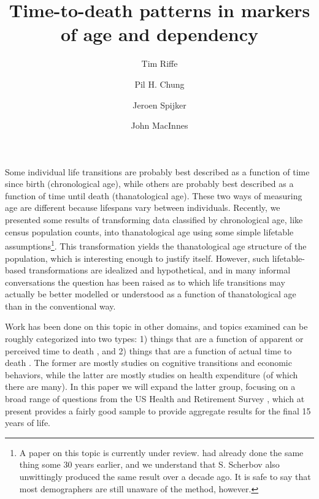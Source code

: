 \documentclass{article}
\begin{document}
\title{Time-to-death patterns in markers of age and dependency}

\author[1]{Tim Riffe}
\author[1]{Pil H. Chung}
\author[2,3]{Jeroen Spijker}
\author[4]{John MacInnes}

\maketitle

Some individual life transitions are probably best described as a function of
time since birth (chronological age), while others are probably best described as a
function of time until death (thanatological age). These two ways of
measuring age are different because lifespans vary between individuals.
Recently, we presented some results of transforming
data classified by chronological age, like census population counts, into
thanatological age using some simple lifetable
assumptions\footnote{\citep{riffe2014paaposter} A paper on this topic is
currently under review. \citet{brouard1986structure, brouard1989mouvements}
had already done the same thing some 30 years earlier, and we understand that
S. Scherbov also unwittingly produced the same result over a decade ago. It is
safe to say that most demographers are still unaware of the method, however.}.
This transformation yields the thanatological age structure of the population,
which is interesting enough to justify itself. However, such lifetable-based
transformations are idealized and hypothetical, and in many informal
conversations the question has been raised as to which life transitions
may actually be better modelled or understood as a function of thanatological
age than in the conventional way.

Work has been done on this topic in other domains, and
topics examined can be roughly categorized into two types: 1) things that are a
function of apparent or perceived time to death
\citep{carstensen2006influence,gan2004subjective,salm2010subjective,van2010living}, and 2) things that are a function of actual time to death
\citep{miller2001increasing,seshamani2004longitudinal}. The former are mostly
studies on cognitive transitions and economic behaviors, while the latter are
mostly studies on health expenditure (of which there are many). In this paper we
will expand the latter group, focusing on a broad range of questions from the US
Health and Retirement Survey \citep{HRS}, which at present provides a fairly
good sample to provide aggregate results for the final 15 years of life.
\end{document}
